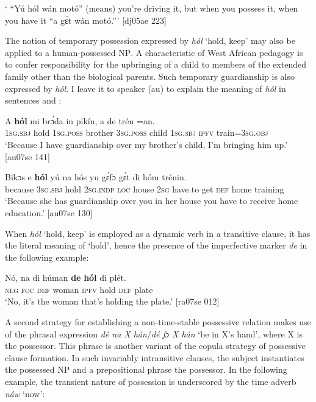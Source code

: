 \glt ` “Yú hól wán motó” (means) you’re driving it, but when you possess it,
when you have it “a gɛ́t wán motó.”’ [dj05ae 223]
\z

The notion of temporary possession expressed by \textit{hól} ‘hold, keep’ may also be applied to a human-possessed \textsc{NP}. A characteristic of West African pedagogy is to confer responsibility for the upbringing of a child to members of the extended family other than the biological parents. Such temporary guardianship is also expressed by \textit{hól}. I leave it to speaker (au) to explain the meaning of \textit{hól} in sentences  and :


\ea%
    \label{ex:key:825}
    \gll A    \textbf{hól}    mi    brɔ́da  in    pikín,  a    de  {trén  =an}.\\
\textsc{1sg.sbj}  hold    \textsc{1sg.poss}  brother  \textsc{3sg.poss}  child  \textsc{1sg.sbj}  \textsc{ipfv}  train=\textsc{3sg.obj}\\

\glt ‘Because I have guardianship over my brother’s child, I’m bringing him up.’ [au07se 141]
\z


\ea%
    \label{ex:key:826}
    \gll Bikɔs  e    \textbf{hól}    yú    na  hós    yu  gɛ́fɔ    gɛ́t
di  hóm    trénin.\\
because  \textsc{3sg.sbj}  hold    \textsc{2sg.indp}  \textsc{loc}  house  \textsc{2sg}  have.to  get
\textsc{def}  home  training\\

\glt ‘Because she has guardianship over you in her house you have to receive 
home education.’ [au07se 130]
\z

When \textit{hól} ‘hold, keep’ is employed as a dynamic verb in a transitive clause, it has the literal meaning of ‘hold’, hence the presence of the imperfective marker \textit{de} in the following example: 


\ea%
    \label{ex:key:827}
    \gll Nó,  na  di  húman  \textbf{de}  \textbf{hól}    di  plét.\\
\textsc{neg}  \textsc{foc}  \textsc{def}  woman  \textsc{ipfv}  hold    \textsc{def}  plate\\

\glt ‘No, it’s the woman that’s holding the plate.’ [ra07se 012]
\z

A second strategy for establishing a non-time-stable possessive relation makes use of the phrasal expression \textit{dé na X hán}/\textit{dé fɔ X hán} ‘be in X’s hand’, where X is the possessor. This phrase is another variant of the copula strategy of possessive clause formation. In such invariably intransitive clauses, the subject instantiates the possessed \textsc{NP} and a prepositional phrase the possessor. In the following example, the transient nature of possession is underscored by the time adverb \textit{náw} ‘now’: 


